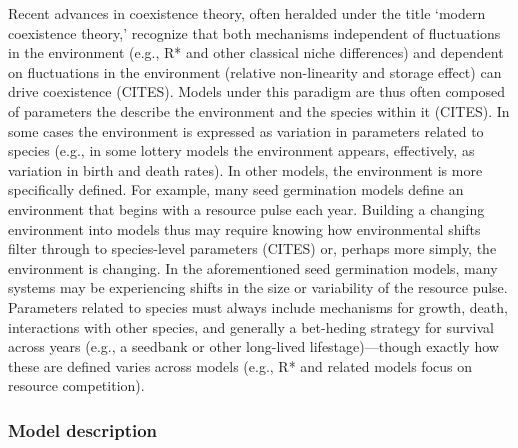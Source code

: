 \documentclass[11pt,letterpaper]{article}
\begin{document}
Recent advances in coexistence theory, often heralded under the title `modern coexistence theory,' recognize that both mechanisms independent of fluctuations in the environment (e.g., R* and other classical niche differences) and dependent on fluctuations in the environment (relative non-linearity and storage effect) can drive coexistence (CITES). Models under this paradigm are thus often composed of parameters the describe the environment and the species within it (CITES). In some cases the environment is expressed as variation in parameters related to species (e.g., in some lottery models the environment appears, effectively, as variation in birth and death rates). In other models, the environment is more specifically defined. For example, many seed germination models define an environment that begins with a resource pulse each year. Building a changing environment into models thus may require knowing how environmental shifts filter through to species-level parameters (CITES) or, perhaps more simply, the environment is changing. In the aforementioned seed germination models, many systems may be experiencing shifts in the size or variability of the resource pulse. Parameters related to species must always include mechanisms for growth, death, interactions with other species, and generally a bet-heding strategy for survival across years (e.g., a seedbank or other long-lived lifestage)---though exactly how these are defined varies across models (e.g., R* and related models focus on resource competition).\\ %

\subsubsection{Model description}
\end{document}
